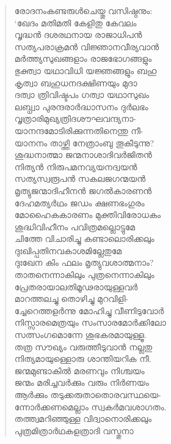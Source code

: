 \begin{verse}
രോദനംകണ്ടരുള്‍ചെയ്തു വസിഷ്ഠനും:\\
‘ഖേദം മതിമതി കേളിതു കേവലം\\
വൃദ്ധന്‍ ദശരഥനായ രാജാധിപന്‍\\
സത്യപരാക്രമന്‍ വിജ്ഞാനവീര്യവാന്‍\\
മര്‍ത്ത്യസുഖങ്ങളാം രാജഭോഗങ്ങളും\\
ഭുക്ത്വാ യഥാവിധി യജ്ഞങ്ങളും ബഹു\\
കൃത്വാ ബഹുധനദക്ഷിണയും മുദാ\\
ദത്വാ ത്രിവിഷ്ടപം ഗത്വാ യഥാസുഖം\\
ലബ്ധ്വാ പുരന്ദരാര്‍ദ്ധാസനം ദുര്‍ലഭം\\
വൃത്രാരിമുഖ്യത്രിദശൗഘവന്ദ്യനാ-\\
യാനന്ദമോടിരിക്കുന്നതിനെന്തു നീ-\\
യാനനം താഴ്ത്തി നേത്രാംബു തൂകീടുന്നു?\\
ശുദ്ധനാത്മാ ജന്മനാശാദിവര്‍ജിതന്‍\\
നിത്യന്‍ നിരുപമനവ്യയനദ്വയന്‍\\
സത്യസ്വരൂപന്‍ സകലജഗന്മയന്‍\\
മൃത്യുജന്മാദിഹീനന്‍ ജഗല്‍കാരണന്‍\\
ദേഹമത്യര്‍ഥം ജഡം ക്ഷണഭംഗുരം\\
മോഹൈകകാരണം മുക്തിവിരോധകം\\
ശുദ്ധിവിഹീനം പവിത്രമല്ലൊട്ടുമേ\\
ചിത്തേ വിചാരിച്ചു കണ്ടാലൊരിക്കലും\\
ദുഃഖിപ്പതിനവകാശമില്ലേതുമേ\\
ദുഃഖേന കിം ഫലം മൃത്യുവശാത്മനാം?\\
താതനെന്നാകിലും പുത്രനെന്നാകിലും\\
പ്രേതരായാലതിമൂഢരായുള്ളവര്‍\\
മാറത്തലച്ചു തൊഴിച്ചു മുറവിളി-\\
ച്ചേറെത്തളര്‍ന്നു മോഹിച്ചു വീണിടുവോര്‍\\
നിസ്സാരമെത്രയും സംസാരമോര്‍ക്കിലോ\\
സത്സംഗമൊന്നേ ശുഭകരമായുള്ളൂ.\\
തത്ര സൗഖ്യം വരുത്തീടുവാന്‍ നല്ലതു\\
നിത്യമായുള്ളൊരു ശാന്തിയറിക നീ.\\
ജന്മമുണ്ടാകില്‍ മരണവും നിശ്ചയം\\
ജന്മം മരിച്ചവര്‍ക്കും വരും നിര്‍ണയം\\
ആര്‍ക്കും തടുക്കരുതാതൊരവസ്ഥയെ-\\
ന്നോര്‍ക്കണമെല്ലാം സ്വകര്‍മവശാഗതം.\\
തത്ത്വമറിഞ്ഞുള്ള വിദ്വാനൊരിക്കലും\\
പുത്രമിത്രാര്‍ഥകളത്രാദി വസ്തുനാ\\

\end{verse}
